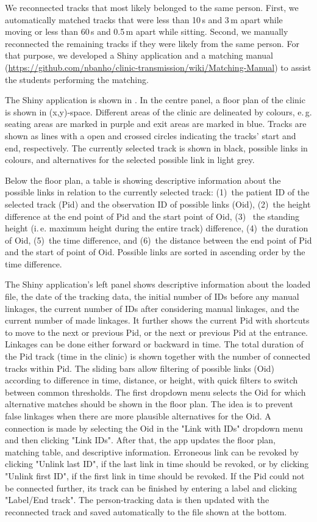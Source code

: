 \documentclass[fleqn,11pt]{wlscirep_supp}
\newcommand\ie{i.\,e.\xspace}
\newcommand\eg{e.\,g.\xspace}
\begin{document}
We reconnected tracks that most likely belonged to the same person. First, we automatically matched tracks that were less than 10\,s and 3\,m apart while moving or less than 60\,s and 0.5\,m apart while sitting. Second, we manually reconnected the remaining tracks if they were likely from the same person. For that purpose, we developed a Shiny application and a matching manual (\url{https://github.com/nbanho/clinic-transmission/wiki/Matching-Manual}) to assist the students performing the matching. 

The Shiny application is shown in . In the centre panel, a floor plan of the clinic is shown in (x,y)-space. Different areas of the clinic are delineated by colours, \eg seating areas are marked in purple and exit areas are marked in blue. Tracks are shown as lines with a open and crossed circles indicating the tracks' start and end, respectively. The currently selected track is shown in black, possible links in colours, and alternatives for the selected possible link in light grey. 

Below the floor plan, a table is showing descriptive information about the possible links in relation to the currently selected track: (1)~the patient ID of the selected track (Pid) and the observation ID of possible links (Oid), (2)~the height difference at the end point of Pid and the start point of Oid, (3)~ the standing height (\ie maximum height during the entire track) difference, (4)~the duration of Oid, (5)~the time difference, and (6)~the distance between the end point of Pid and the start of point of Oid. Possible links are sorted in ascending order by the time difference. 

The Shiny application's left panel shows descriptive information about the loaded file, the date of the tracking data, the initial number of IDs before any manual linkages, the current number of IDs after considering manual linkages, and the current number of made linkages. It further shows the current Pid with shortcuts to move to the next or previous Pid, or the next or previous Pid at the entrance. Linkages can be done either forward or backward in time. The total duration of the Pid track (time in the clinic) is shown together with the number of connected tracks within Pid. The sliding bars allow filtering of possible links (Oid) according to difference in time, distance, or height, with quick filters to switch between common thresholds. The first dropdown menu selects the Oid for which alternative matches should be shown in the floor plan. The idea is to prevent false linkages when there are more plausible alternatives for the Oid. A connection is made by selecting the Oid in the "Link with IDs" dropdown menu and then clicking "Link IDs". After that, the app updates the floor plan, matching table, and descriptive information. Erroneous link can be revoked by clicking "Unlink last ID", if the last link in time should be revoked, or by clicking "Unlink first ID", if the first link in time should be revoked. If the Pid could not be connected further, its track can be finished by entering a label and clicking "Label/End track". The person-tracking data is then updated with the reconnected track and saved automatically to the file shown at the bottom.
\end{document}
